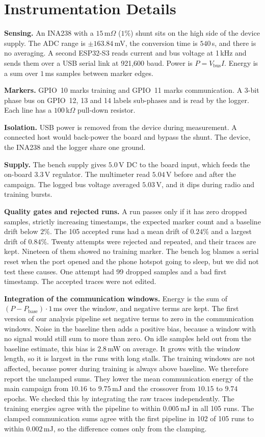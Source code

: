 \documentclass[journal]{IEEEtran}
\begin{document}
\appendices
\section{Instrumentation Details}
\textbf{Sensing.} An INA238 with a $15$\,m$\Omega$ ($1\%$) shunt sits on the high side of the device supply. The ADC range is $\pm163.84$\,mV, the conversion time is $540$\,\textmu s, and there is no averaging. A second ESP32-S3 reads current and bus voltage at 1\,kHz and sends them over a USB serial link at 921{,}600 baud. Power is $P=V_{\mathrm{bus}}I$. Energy is a sum over $1$\,ms samples between marker edges.

\textbf{Markers.} GPIO~10 marks training and GPIO~11 marks communication. A 3-bit phase bus on GPIO~12, 13 and 14 labels sub-phases and is read by the logger. Each line has a $100$\,k$\Omega$ pull-down resistor.

\textbf{Isolation.} USB power is removed from the device during measurement. A connected host would back-power the board and bypass the shunt. The device, the INA238 and the logger share one ground.

\textbf{Supply.} The bench supply gives $5.0$\,V DC to the board input, which feeds the on-board $3.3$\,V regulator. The multimeter read $5.04$\,V before and after the campaign. The logged bus voltage averaged $5.03$\,V, and it dips during radio and training bursts.

\textbf{Quality gates and rejected runs.} A run passes only if it has zero dropped samples, strictly increasing timestamps, the expected marker count and a baseline drift below $2\%$. The 105 accepted runs had a mean drift of $0.24\%$ and a largest drift of $0.84\%$. Twenty attempts were rejected and repeated, and their traces are kept. Nineteen of them showed no training marker. The bench log blames a serial reset when the port opened and the phone hotspot going to sleep, but we did not test these causes. One attempt had 99 dropped samples and a bad first timestamp. The accepted traces were not edited.

\textbf{Integration of the communication windows.} Energy is the sum of $(P-P_{\mathrm{base}})\cdot1$\,ms over the window, and negative terms are kept. The first version of our analysis pipeline set negative terms to zero in the communication windows. Noise in the baseline then adds a positive bias, because a window with no signal would still sum to more than zero. On idle samples held out from the baseline estimate, this bias is $2.8$\,mW on average. It grows with the window length, so it is largest in the runs with long stalls. The training windows are not affected, because power during training is always above baseline. We therefore report the unclamped sums. They lower the mean communication energy of the main campaign from $10.16$ to $9.75$\,mJ and the crossover from $10.15$ to $9.74$ epochs. We checked this by integrating the raw traces independently. The training energies agree with the pipeline to within $0.005$\,mJ in all 105 runs. The clamped communication sums agree with the first pipeline in 102 of 105 runs to within $0.002$\,mJ, so the difference comes only from the clamping.
\end{document}
